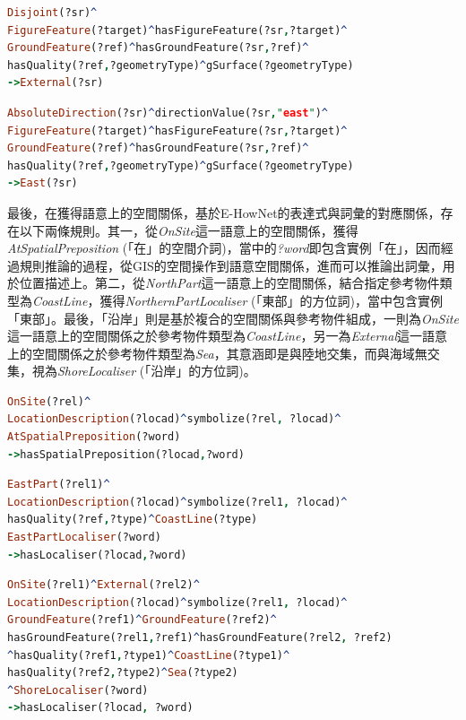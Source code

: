 \begin{lstlisting}[language=Prolog, basicstyle=\ttfamily, xleftmargin=2em]
Disjoint(?sr)^
FigureFeature(?target)^hasFigureFeature(?sr,?target)^
GroundFeature(?ref)^hasGroundFeature(?sr,?ref)^
hasQuality(?ref,?geometryType)^gSurface(?geometryType)
->External(?sr)
\end{lstlisting}

\begin{lstlisting}[language=Prolog, basicstyle=\ttfamily, xleftmargin=2em]
AbsoluteDirection(?sr)^directionValue(?sr,"east")^
FigureFeature(?target)^hasFigureFeature(?sr,?target)^
GroundFeature(?ref)^hasGroundFeature(?sr,?ref)^
hasQuality(?ref,?geometryType)^gSurface(?geometryType)
->East(?sr)
\end{lstlisting}

最後，在獲得語意上的空間關係，基於E-HowNet的表達式與詞彙的對應關係，存在以下兩條規則。其一，從\textit{OnSite}這一語意上的空間關係，獲得\textit{AtSpatialPreposition} (「在」的空間介詞)，當中的\textit{?word}即包含實例「在」，因而經過規則推論的過程，從GIS的空間操作到語意空間關係，進而可以推論出詞彙，用於位置描述上。第二，從\textit{NorthPart}這一語意上的空間關係，結合指定參考物件類型為\textit{CoastLine}，獲得\textit{NorthernPartLocaliser} (「東部」的方位詞)，當中包含實例「東部」。最後，「沿岸」則是基於複合的空間關係與參考物件組成，一則為\textit{OnSite}這一語意上的空間關係之於參考物件類型為\textit{CoastLine}，另一為\textit{External}這一語意上的空間關係之於參考物件類型為\textit{Sea}，其意涵即是與陸地交集，而與海域無交集，視為\textit{ShoreLocaliser} (「沿岸」的方位詞)。

\begin{lstlisting}[language=Prolog, basicstyle=\ttfamily, xleftmargin=2em]
OnSite(?rel)^
LocationDescription(?locad)^symbolize(?rel, ?locad)^
AtSpatialPreposition(?word)
->hasSpatialPreposition(?locad,?word)
\end{lstlisting}

\begin{lstlisting}[language=Prolog, basicstyle=\ttfamily, xleftmargin=2em]
EastPart(?rel1)^
LocationDescription(?locad)^symbolize(?rel1, ?locad)^
hasQuality(?ref,?type)^CoastLine(?type)
EastPartLocaliser(?word)
->hasLocaliser(?locad,?word)
\end{lstlisting}

\begin{lstlisting}[language=Prolog, basicstyle=\ttfamily, xleftmargin=2em]
OnSite(?rel1)^External(?rel2)^
LocationDescription(?locad)^symbolize(?rel1, ?locad)^
GroundFeature(?ref1)^GroundFeature(?ref2)^
hasGroundFeature(?rel1,?ref1)^hasGroundFeature(?rel2, ?ref2)
^hasQuality(?ref1,?type1)^CoastLine(?type1)^
hasQuality(?ref2,?type2)^Sea(?type2)
^ShoreLocaliser(?word)
->hasLocaliser(?locad, ?word)
\end{lstlisting}

